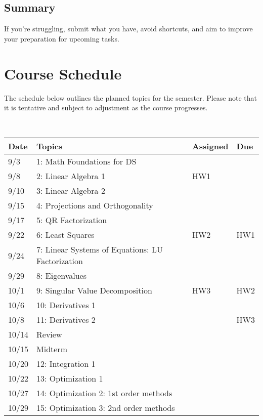 \documentclass[11pt]{article}
\begin{document}
\subsection*{Summary}

If you're struggling, submit what you have, avoid shortcuts, and aim to improve your preparation for upcoming tasks.

\section*{Course Schedule}

The schedule below outlines the planned topics for the semester. Please note that it is tentative and subject to adjustment as the course progresses.

~\\
\small
\begin{centering}
\begin{tabular}{||l|p{3in}|l|l||}
\hline\hline
Date & Topics  & Assigned & Due  \\
\hline\hline
9/3 & 1: Math Foundations for DS &   & \\
\hline
9/8 & 2: Linear Algebra 1 & HW1   & \\
9/10& 3: Linear Algebra 2 &   & \\
\hline
9/15 &  4: Projections and Orthogonality  &  &  \\
9/17& 5: QR Factorization &  &   \\
\hline
9/22& 6: Least Squares   & HW2    &HW1   \\
9/24 & 7: Linear Systems of Equations: LU Factorization   &  & \\
\hline
9/29 & 8: Eigenvalues  &  &   \\ 
10/1 & 9: Singular Value Decomposition & HW3 & HW2  \\
\hline
10/6 & 10: Derivatives 1 &  &  \\
10/8& 11: Derivatives 2  &   & HW3   \\  
\hline 
10/14& Review &  &   \\
10/15 & Midterm& &\\
\hline
10/20 & 12: Integration 1   &  &\\
10/22 & 13: Optimization 1   &  &  \\ 
\hline
  
10/27 & 14: Optimization 2: 1st order methods  & &  \\  
10/29& 15:  Optimization 3: 2nd order methods & & \\
\hline


\end{tabular}
\end{centering}
\end{document}
